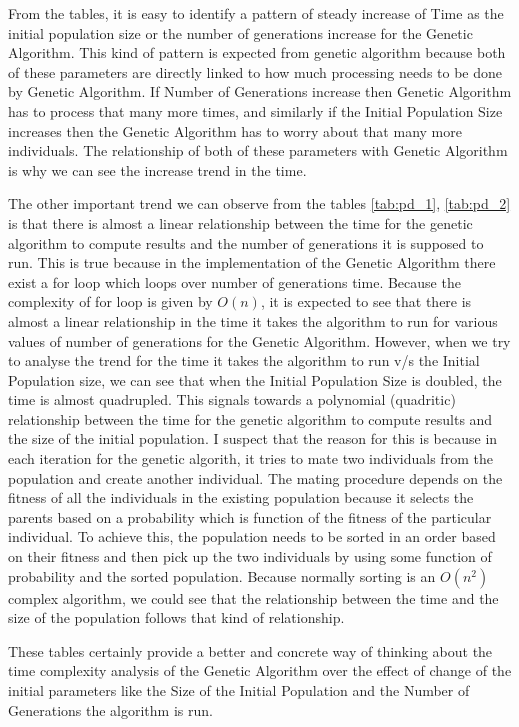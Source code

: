 \documentclass[11pt]{article}
\begin{document}
From the tables, it is easy to identify a pattern of steady increase of Time as the initial population size or the 
number of generations increase for the Genetic Algorithm. This kind of pattern is expected from genetic algorithm because
both of these parameters are directly linked to how much processing needs to be done by Genetic Algorithm. If 
Number of Generations increase then Genetic Algorithm has to process that many more times, and similarly if the 
Initial Population Size increases then the Genetic Algorithm has to worry about that many more individuals. The relationship
of both of these parameters with Genetic Algorithm is why we can see the increase trend in the time.

The other important trend we can observe from the tables \ref{tab:pd_1}, \ref{tab:pd_2} is that there is almost a linear relationship between the time for the genetic algorithm to compute results and the number of generations it is supposed to run. This is true because in the implementation of the Genetic Algorithm there exist a for loop which loops over number of generations time. Because the complexity of for loop is given by $O(n)$, it is expected to see that there is almost a linear relationship in the time it takes the algorithm to run for various values of number of generations for the Genetic Algorithm. However, when we try to analyse the trend for the time it takes the algorithm to run v/s the Initial Population size, we can see that when the Initial Population Size is doubled, the time is almost quadrupled. This signals towards a polynomial (quadritic) relationship between the time for the genetic algorithm to compute results and the size of the initial population. I suspect that the reason for this is because in each iteration for the genetic algorith, it tries to mate two individuals from the population and create another individual. The mating procedure depends on the fitness of all the individuals in the existing population because it selects the parents based on a probability which is function of the fitness of the particular individual. To achieve this, the population needs to be sorted in an order based on their fitness and then pick up the two individuals by using some function of probability and the sorted population. Because normally sorting is an $O(n^2)$ complex algorithm, we could see that the relationship between the time and the size of the population follows that kind of relationship.

These tables certainly provide a better and concrete way of thinking about the time complexity analysis of the Genetic Algorithm over the effect of change of the initial parameters like the Size of the Initial Population and the Number of Generations the algorithm is run.
\end{document}
